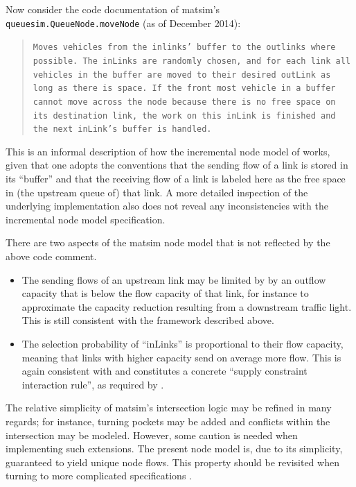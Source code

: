 Now consider the code documentation of \gls{matsim}'s \lstinline|queuesim.QueueNode.moveNode|
(as of December 2014):
\begin{quote}
\noindent \texttt{Moves vehicles from the inlinks' buffer to the outlinks
where possible. The inLinks are randomly chosen, and for each link
all vehicles in the buffer are moved to their desired outLink as long
as there is space. If the front most vehicle in a buffer cannot move
across the node because there is no free space on its destination
link, the work on this inLink is finished and the next inLink's buffer
is handled.}
\end{quote}
This is an informal description of how the incremental node model
of \citet{floetteroed-2011a} works, given that one adopts the conventions
that the sending flow of a link is stored in its {}``buffer'' and
that the receiving flow of a link is labeled here as the free space
in (the upstream queue of) that link. A more detailed inspection of
the underlying implementation also does not reveal any inconsistencies
with the incremental node model specification.

There are two aspects of the \gls{matsim} node model that is not reflected
by the above code comment.
\begin{itemize}
\item The sending flows of an upstream link may be limited by by an outflow
capacity that is below the flow capacity  of
that link, for instance to approximate the capacity reduction resulting
from a downstream traffic light. This is still consistent with the
framework described above.
\item The selection probability of {}``inLinks'' is proportional to their
flow capacity, meaning that links with higher capacity send on average
more flow. This is again consistent with \citet{floetteroed-2011a}
and constitutes a concrete {}``supply constraint interaction rule'',
as required by \citet{tampere-2010b}.
\end{itemize}
The relative simplicity of \gls{matsim}'s intersection logic may be refined
in many regards; for instance, turning pockets may be added and conflicts
within the intersection may be modeled. 
However, some caution is needed when implementing such extensions.
The present node model is, due to its simplicity, guaranteed to yield
unique node flows. This property should be revisited when turning
to more complicated specifications \citep{corthout-2012}.

